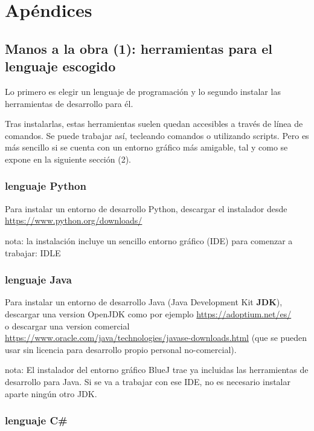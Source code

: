\documentclass[spanish,12pt,a4paper,final,oneside]{book}
\begin{document}
\chapter{Apéndices}

\section{Manos a la obra (1): herramientas para el lenguaje escogido}\label{manos_a_la_obra_1}


Lo primero es elegir un lenguaje de programación y lo segundo instalar las herramientas de desarrollo para él. 

Tras instalarlas, estas herramientas suelen quedan accesibles a través de línea de comandos. Se puede trabajar así, tecleando comandos o utilizando scripts. Pero es más sencillo si se cuenta con un entorno gráfico más amigable, tal y como se expone en la siguiente sección (2).


\subsection{lenguaje Python}

Para instalar un entorno de desarrollo Python, descargar el instalador desde \\ \url{https://www.python.org/downloads/}

nota: la instalación incluye un sencillo entorno gráfico (IDE) para comenzar a trabajar:  IDLE


\subsection{lenguaje Java}

Para instalar un entorno de desarrollo Java (Java Development Kit \textbf{JDK}), descargar una version OpenJDK como por ejemplo \url{https://adoptium.net/es/}
\\ o descargar una version comercial \url{https://www.oracle.com/java/technologies/javase-downloads.html} (que se pueden usar sin licencia para desarrollo propio personal no-comercial). 

nota: El instalador del entorno gráfico BlueJ trae ya incluidas las herramientas de desarrollo para Java. Si se va a trabajar con ese IDE, no es necesario instalar aparte ningún otro JDK.



\subsection{lenguaje C\#}
\end{document}
